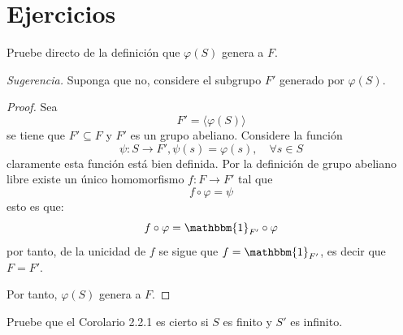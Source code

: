 \documentclass[12pt]{report}
\theoremstyle{largebreak}
\newcommand\cf[3]{\ensuremath{#1:#2\rightarrow#3}}
\newcommand{\bbm}[1]{\mathbbm{#1}}
\begin{document}
    \newpage

    \section{Ejercicios}

    \begin{excer}
        Pruebe directo de la definición que $\varphi(S)$ genera a $F$.

        \textit{Sugerencia.} Suponga que no, considere el subgrupo $F'$ generado por $\varphi(S)$.
    \end{excer}

    \begin{proof}
        Sea
        \begin{equation*}
            F'=\langle\varphi(S)\rangle
        \end{equation*}
        se tiene que $F'\subseteq F$ y $F'$ es un grupo abeliano. Considere la función
        \begin{equation*}
            \cf{\psi}{S}{F'},\psi(s)=\varphi(s),\quad\forall s\in S
        \end{equation*}
        claramente esta función está bien definida. Por la definición de grupo abeliano libre existe un único homomorfismo $\cf{f}{F}{F'}$ tal que
        \begin{equation*}
            f\circ\varphi=\psi
        \end{equation*}
        esto es que:
        \begin{equation*}
            f\circ\varphi=\bbm{1}_{F'}\circ\varphi
        \end{equation*}
        por tanto, de la unicidad de $f$ se sigue que $f=\bbm{1}_{F'}$, es decir que $F=F'$.

        Por tanto, $\varphi(S)$ genera a $F$.
    \end{proof}

    \begin{excer}
        Pruebe que el Corolario 2.2.1 es cierto si $S$ es finito y $S'$ es infinito.
    \end{excer}
    
\end{document}
